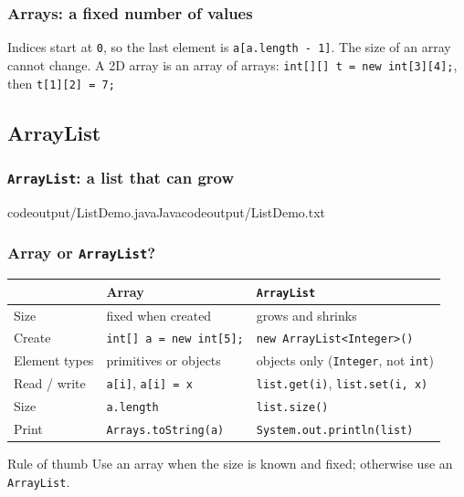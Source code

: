 \documentclass[aspectratio=169,10pt,compress]{beamer}
\begin{document}
\begin{frame}[t,fragile] \frametitle{Arrays: a fixed number of values}

  \small Indices start at \texttt{0}, so the last element is \texttt{a[a.length - 1]}. The size of an array cannot change.
  A 2D array is an array of arrays: \texttt{int[][] t = new int[3][4];}, then \texttt{t[1][2] = 7;}
\end{frame}

\subsection[ArrayList]{ArrayList}




\begin{frame}[t,fragile] \frametitle{\texttt{ArrayList}: a list that can grow}
  \lstcodeoverlaystep[basicstyle=\ttfamily\scriptsize][basicstyle=\ttfamily\scriptsize][0.41\textwidth]{9.9cm,2.2cm}%
    {codeoutput/ListDemo.java}{Java}{codeoutput/ListDemo.txt}
\end{frame}




\begin{frame}[t,fragile] \frametitle{Array or \texttt{ArrayList}?}
  \small
  \begin{tabular}{@{}L{0.24\textwidth}L{0.33\textwidth}L{0.35\textwidth}@{}}
    \toprule
    & \textbf{Array} & \textbf{\texttt{ArrayList}} \\
    \midrule
    Size              & fixed when created            & grows and shrinks \\
    Create            & \texttt{int[] a = new int[5];} & \texttt{new ArrayList<Integer>()} \\
    Element types     & primitives or objects         & objects only (\texttt{Integer}, not \texttt{int}) \\
    Read / write      & \texttt{a[i]}, \texttt{a[i] = x} & \texttt{list.get(i)}, \texttt{list.set(i, x)} \\
    Size              & \texttt{a.length}             & \texttt{list.size()} \\
    Print             & \texttt{Arrays.toString(a)}   & \texttt{System.out.println(list)} \\
    \bottomrule
  \end{tabular}

  \vspace{0.8em}
  \begin{block}{Rule of thumb}
    Use an array when the size is known and fixed; otherwise use an \texttt{ArrayList}.
  \end{block}
\end{frame}
\end{document}
